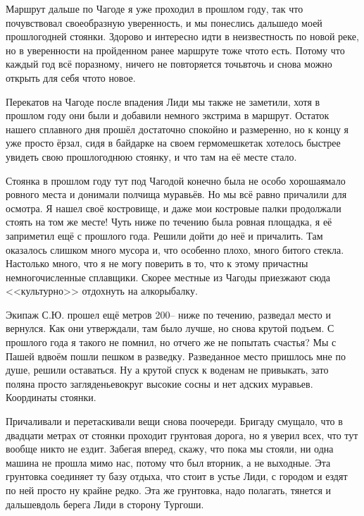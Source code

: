 Маршрут дальше по Чагоде я уже проходил в прошлом году, так что почувствовал своеобразную уверенность, и мы понеслись дальше\mdash  до моей прошлогодней стоянки. Здорово и интересно идти в неизвестность по новой реке, но в уверенности на пройденном ранее маршруте тоже что\sdash то есть. Потому что каждый год всё по\sdash разному, ничего не повторяется точь\sdash в\sdash точь и снова можно открыть для себя что\sdash то новое. 
 
Перекатов на Чагоде после впадения Лиди мы также не заметили, хотя в прошлом году они были и добавили немного экстрима в маршрут. Остаток нашего сплавного дня прошёл достаточно спокойно и размеренно, но к концу я уже просто ёрзал, сидя в байдарке на своем гермомешке\mdash  так хотелось быстрее увидеть свою прошлогоднюю стоянку, и что там на её месте стало. 

Стоянка в прошлом году тут под Чагодой конечно была не особо хорошая\mdash  мало ровного места и донимали полчища муравьёв. Но мы всё равно причалили для осмотра. Я нашел своё костровище, и даже мои костровые палки продолжали стоять на том же месте! Чуть ниже по течению была ровная площадка, я её заприметил ещё с прошлого года. Решили дойти до неё и причалить. Там оказалось слишком много мусора и, что особенно плохо, много битого стекла. Настолько много, что я не могу поверить в то, что к этому причастны немногочисленные сплавщики. Скорее местные из Чагоды приезжают сюда <<культурно>> отдохнуть на алкорыбалку. 

Экипаж С.Ю. прошел ещё метров 200\thinspace\nobreakdash-- ниже по течению, разведал место и вернулся. Как они утверждали, там было лучше, но снова крутой подъем. С прошлого года я такого не помнил, но отчего же не попытать счастья? Мы с Пашей вдвоём пошли пешком в разведку. Разведанное место пришлось мне по душе, решили оставаться. Ну а крутой спуск к воде\mdash  нам не привыкать, зато поляна просто загляденье\mdash  вокруг высокие сосны и нет адских муравьев. Координаты стоянки\mdash \CoordsChagodaSixteenDrunk.

Причаливали и перетаскивали вещи снова по\sdash очереди. Бригаду смущало, что в двадцати метрах от стоянки проходит грунтовая дорога, но я уверил всех, что тут вообще никто не ездит. Забегая вперед, скажу, что пока мы стояли, ни одна машина не прошла мимо нас, потому что был вторник, а не выходные. Эта грунтовка соединяет ту базу отдыха, что стоит в устье Лиди, с городом и ездят по ней просто ну крайне редко. Эта же грунтовка, надо полагать, тянется и дальше\mdash вдоль берега Лиди в сторону Тургоши.

